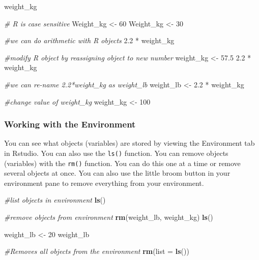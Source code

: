 \documentclass[]{article}
\newenvironment{Shaded}{\begin{snugshade}}{\end{snugshade}}
\newcommand{\KeywordTok}[1]{\textcolor[rgb]{0.13,0.29,0.53}{\textbf{{#1}}}}
\newcommand{\DataTypeTok}[1]{\textcolor[rgb]{0.13,0.29,0.53}{{#1}}}
\newcommand{\DecValTok}[1]{\textcolor[rgb]{0.00,0.00,0.81}{{#1}}}
\newcommand{\FloatTok}[1]{\textcolor[rgb]{0.00,0.00,0.81}{{#1}}}
\newcommand{\StringTok}[1]{\textcolor[rgb]{0.31,0.60,0.02}{{#1}}}
\newcommand{\CommentTok}[1]{\textcolor[rgb]{0.56,0.35,0.01}{\textit{{#1}}}}
\newcommand{\NormalTok}[1]{{#1}}
\begin{document}
\begin{Shaded}
\begin{Highlighting}[]
\NormalTok{weight_kg}

\CommentTok{# R is case sensitive}
\NormalTok{Weight_kg <-}\StringTok{ }\DecValTok{60}
\NormalTok{Weight_kg <-}\StringTok{ }\DecValTok{30}


\CommentTok{#we can do arithmetic with R objects}
\FloatTok{2.2} \NormalTok{*}\StringTok{ }\NormalTok{weight_kg}

\CommentTok{#modify R object by reassigning object to new number}
\NormalTok{weight_kg <-}\StringTok{ }\FloatTok{57.5}
\FloatTok{2.2} \NormalTok{*}\StringTok{ }\NormalTok{weight_kg}

\CommentTok{#we can re-name 2.2*weight_kg as weight_lb}
\NormalTok{weight_lb <-}\StringTok{ }\FloatTok{2.2} \NormalTok{*}\StringTok{ }\NormalTok{weight_kg}

\CommentTok{#change value of weight_kg}
\NormalTok{weight_kg <-}\StringTok{ }\DecValTok{100}
\end{Highlighting}
\end{Shaded}

\subsubsection{Working with the
Environment}\label{working-with-the-environment}

You can see what objects (variables) are stored by viewing the
Environment tab in Rstudio. You can also use the \texttt{ls()} function.
You can remove objects (variables) with the \texttt{rm()} function. You
can do this one at a time or remove several objects at once. You can
also use the little broom button in your environment pane to remove
everything from your environment.

\begin{Shaded}
\begin{Highlighting}[]
\CommentTok{#list objects in environment}
\KeywordTok{ls}\NormalTok{()}

\CommentTok{#remove objects from environment}
\KeywordTok{rm}\NormalTok{(weight_lb, weight_kg)}
\KeywordTok{ls}\NormalTok{()}

\NormalTok{weight_lb <-}\StringTok{ }\DecValTok{20}
\NormalTok{weight_lb}

\CommentTok{#Removes all objects from the environment}
\KeywordTok{rm}\NormalTok{(}\DataTypeTok{list =} \KeywordTok{ls}\NormalTok{())}
\end{Highlighting}
\end{Shaded}
\end{document}
